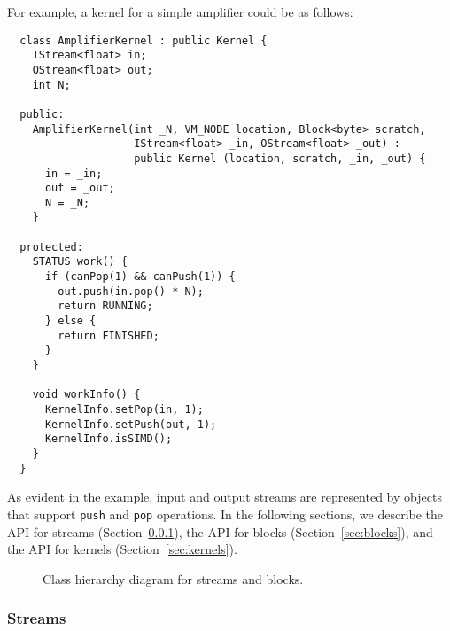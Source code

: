 \noindent For example, a kernel for a simple amplifier could be as follows:
{\small
\begin{verbatim}
  class AmplifierKernel : public Kernel {
    IStream<float> in;
    OStream<float> out;
    int N;

  public:
    AmplifierKernel(int _N, VM_NODE location, Block<byte> scratch, 
                    IStream<float> _in, OStream<float> _out) : 
                    public Kernel (location, scratch, _in, _out) {
      in = _in;
      out = _out;
      N = _N;
    }

  protected:
    STATUS work() {
      if (canPop(1) && canPush(1)) {
        out.push(in.pop() * N);
        return RUNNING;
      } else {
        return FINISHED;
      }
    }

    void workInfo() {
      KernelInfo.setPop(in, 1);
      KernelInfo.setPush(out, 1);
      KernelInfo.isSIMD();
    }
  }  
\end{verbatim}}
As evident in the example, input and output streams are represented by
objects that support {\tt push} and {\tt pop} operations.  In the
following sections, we describe the API for streams
(Section~\ref{sec:kerstreams}), the API for blocks
(Section~\ref{sec:blocks}), and the API for kernels
(Section~\ref{sec:kernels}).

\begin{figure}[t]
\begin{center}
\end{center}
\vspace{-12pt}
\caption{Class hierarchy diagram for streams and blocks.\protect\label{fig:inherit}}
\end{figure}



\subsubsection{Streams}
\label{sec:kerstreams}

